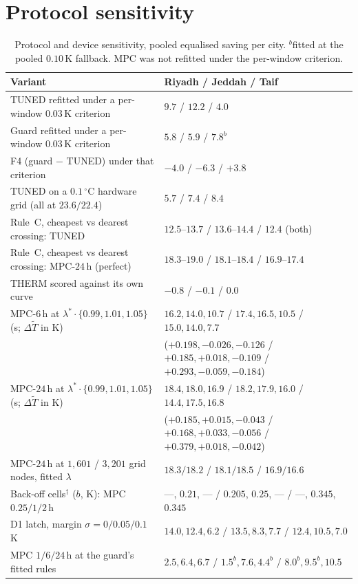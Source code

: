 \documentclass[11pt]{article}
\begin{document}
\section{Protocol sensitivity}
\label{sec:s-protocol}

\begin{table}[!ht]
\centering
\caption{Protocol and device sensitivity, pooled equalised saving per city.
$^{b}$fitted at the pooled $0.10\,$K fallback. MPC was not refitted under the per-window criterion.}
\label{tab:s-protocol}
\small
\begin{tabularx}{\textwidth}{@{}l>{\raggedright\arraybackslash}X@{}}
\toprule
Variant & Riyadh / Jeddah / Taif \\
\midrule
TUNED refitted under a per-window $0.03\,$K criterion & $9.7$ / $12.2$ / $4.0$ \\
Guard refitted under a per-window $0.03\,$K criterion & $5.8$ / $5.9$ / $7.8^{b}$ \\
F4 (guard $-$ TUNED) under that criterion & $-4.0$ / $-6.3$ / $+3.8$ \\
TUNED on a $0.1\,^\circ$C hardware grid (all at $23.6/22.4$) & $5.7$ / $7.4$ / $8.4$ \\
Rule~C, cheapest vs dearest crossing: TUNED & $12.5$--$13.7$ / $13.6$--$14.4$ / $12.4$ (both) \\
Rule~C, cheapest vs dearest crossing: MPC-$24\,$h (perfect) & $18.3$--$19.0$ / $18.1$--$18.4$ / $16.9$--$17.4$ \\
THERM scored against its own curve & $-0.8$ / $-0.1$ / $0.0$ \\
MPC-$6\,$h at $\lambda^\ast\cdot\{0.99,1.01,1.05\}$ (s; $\Delta\tilde T$ in K) & $16.2,14.0,10.7$ / $17.4,16.5,10.5$ / $15.0,14.0,7.7$ \\
 & ($+0.198,-0.026,-0.126$ / $+0.185,+0.018,-0.109$ / $+0.293,-0.059,-0.184$) \\
MPC-$24\,$h at $\lambda^\ast\cdot\{0.99,1.01,1.05\}$ (s; $\Delta\tilde T$ in K) & $18.4,18.0,16.9$ / $18.2,17.9,16.0$ / $14.4,17.5,16.8$ \\
 & ($+0.185,+0.015,-0.043$ / $+0.168,+0.033,-0.056$ / $+0.379,+0.018,-0.042$) \\
MPC-$24\,$h at $1{,}601$ / $3{,}201$ grid nodes, fitted $\lambda$ & $18.3/18.2$ / $18.1/18.5$ / $16.9/16.6$ \\
Back-off cells$^\dagger$ ($b$, K): MPC $0.25/1/2\,$h & ---, $0.21$, --- / $0.205$, $0.25$, --- / ---, $0.345$, $0.345$ \\
D1 latch, margin $\sigma=0/0.05/0.1\,$K & $14.0, 12.4, 6.2$ / $13.5, 8.3, 7.7$ / $12.4, 10.5, 7.0$ \\
MPC $1/6/24\,$h at the guard's fitted rules & $2.5, 6.4, 6.7$ / $1.5^{b}, 7.6, 4.4^{b}$ / $8.0^{b}, 9.5^{b}, 10.5$ \\
\bottomrule
\end{tabularx}
\end{table}
\end{document}
